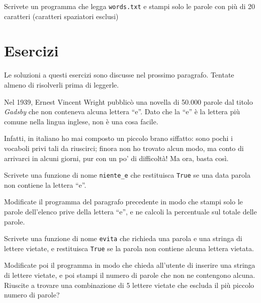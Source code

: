 \documentclass[10pt]{book}
\begin{document}
\vspace{0.2in}
\begin{exercise}

Scrivete un programma che legga {\tt words.txt} e stampi solo le parole con più di 20 caratteri (caratteri spaziatori esclusi)

\end{exercise}


\section{Esercizi}

Le soluzioni a questi esercizi sono discusse nel prossimo paragrafo. Tentate almeno di risolverli prima di leggerle.

\vspace{0.2in}
\begin{exercise}

Nel 1939, Ernest Vincent Wright pubblicò una novella di 50.000 parole dal titolo
{\em Gadsby} che non conteneva alcuna lettera ``e''.  Dato che la ``e'' è la lettera più comune nella lingua inglese, non è una cosa facile.

Infatti, in italiano ho mai composto un piccolo brano siffatto: sono pochi i vocaboli privi tali da riuscirci; finora non ho trovato alcun modo, ma conto di arrivarci in alcuni giorni, pur con un po' di difficoltà! Ma ora, basta così.

Scrivete una funzione di nome \verb"niente_e" che restituisca {\tt True} se una data parola non contiene la lettera ``e''.

Modificate il programma del paragrafo precedente in modo che stampi solo le parole dell'elenco prive della lettera ``e'', e ne calcoli la percentuale sul totale delle parole.

\end{exercise}

\vspace{0.2in}
\begin{exercise} 

Scrivete una funzione di nome {\tt evita} che richieda una parola e una stringa di lettere vietate, e restituisca {\tt True} se la parola non contiene alcuna lettera vietata.

Modificate poi il programma in modo che chieda all'utente di inserire una stringa di lettere vietate, e poi stampi il numero di parole che non ne contengono alcuna. Riuscite a trovare una combinazione di 5 lettere vietate che escluda il più piccolo numero di parole?

\end{exercise}
\end{document}
